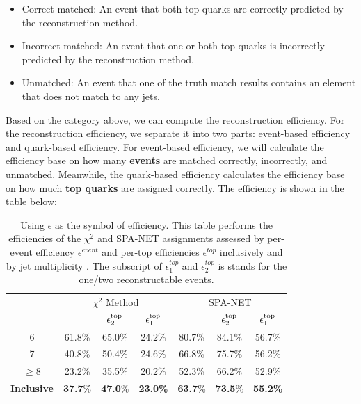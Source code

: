 \begin{itemize}
	\item Correct matched: An event that both top quarks are correctly predicted by the reconstruction method.
	\item Incorrect matched: An event that one or both top quarks is incorrectly predicted by the reconstruction method.
	\item Unmatched: An event that one of the truth match results contains an element that does not match to any jets.
\end{itemize}
Based on the category above, we can compute the reconstruction efficiency. For the reconstruction efficiency, we separate it into two parts: event-based efficiency and quark-based efficiency. For event-based efficiency, we will calculate the efficiency base on how many \textbf{events} are matched correctly, incorrectly, and unmatched. Meanwhile, the quark-based efficiency calculates the efficiency base on how much \textbf{top quarks} are assigned correctly. The efficiency is shown in the table below:
\\
\begin{table}[H]
	\caption{Using $\epsilon$ as the symbol of efficiency. This table performs the efficiencies of the $\chi^2$ and SPA-NET assignments assessed by per-event efficiency $\epsilon^{event}$ and per-top efficiencies $\epsilon^{top}$ inclusively and by jet multiplicity \Njets. The subscript of $\epsilon^{top}_{1}$ and $\epsilon^{top}_{2}$ is stands for the one/two reconstructable events.}
	\centering
	\begin{tabular}{c c  c  c  c c  c}
		\hline
		\hline
		& \multicolumn{3}{c}{$\chi^2$ Method} & \multicolumn{3}{c}{SPA-NET }\\
		\hspace{0.2cm}\Njets & \hspace{0.15cm} \epsevent & $\epsilon^\mathrm{top}_2$ & \hspace{0.15cm} $\epsilon^\mathrm{top}_1$ \hspace{0.15cm} & \hspace{0.15cm} \epsevent & $\epsilon^\mathrm{top}_2$ & \hspace{0.15cm} $\epsilon^\mathrm{top}_1$ \hspace{0.15cm}   \\
		\midrule
		6          & 61.8\% & 65.0\% & 24.2\% & 80.7\% & 84.1\% & 56.7\% \\
		7          & 40.8\% & 50.4\% & 24.6\% & 66.8\% & 75.7\% & 56.2\% \\
		$\geq$8    & 23.2\% & 35.5\% & 20.2\% & 52.3\% & 66.2\% & 52.9\% \\
		\midrule     
		\vspace{0.2cm}
		\textbf{Inclusive}  &\textbf{ 37.7}\% & \textbf{47.0}\% & \textbf{23.0\%} & \textbf{63.7}\% &\textbf{73.5}\% &\textbf{55.2\%} \\
		\hline
	\end{tabular}
	\label{tab:eps}
\end{table}
